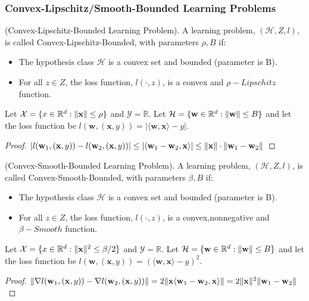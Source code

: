 \subsubsection{Convex-Lipschitz/Smooth-Bounded Learning Problems}

\begin{defn}
	(Convex-Lipschitz-Bounded Learning Problem).
	A learning problem, $ (\mathcal{H}, Z, l) $, is called Convex-Lipschitz-Bounded, with parameters $ \rho, B $ if:
	\begin{itemize}
		\item The hypothesis class $ \mathcal{H} $ is a convex set and bounded (parameter is B).
		\item For all $ z \in Z $, the loss function, $ l(\cdot, z) $, is a convex and $ \rho-Lipschitz $ function.
	\end{itemize}
\end{defn}

\begin{exm}
	Let $ \mathcal{X} = \{ x \in \mathbb{R}^d : \Arrowvert \mathbf{x} \Arrowvert \le \rho \} $ and $ \mathcal{Y} = \mathbb{R} $.
	Let $ \mathcal{H} = \{ \mathbf{w} \in \mathbb{R}^d : \Arrowvert \mathbf{w} \Arrowvert \le B \} $ and
	let the loss function be $ l(\mathbf{w},(\mathbf{x},y)) = | \langle \mathbf{w}, \mathbf{x} \rangle - y | $.
	\begin{proof}
		$ |l(\mathbf{w}_1, (\mathbf{x},y)) - l(\mathbf{w}_2, (\mathbf{x},y))|
		\le |\langle \mathbf{w}_1 - \mathbf{w}_2, \mathbf{x} \rangle|
		\le \Arrowvert \mathbf{x} \Arrowvert \cdot \Arrowvert \mathbf{w}_1 - \mathbf{w}_2 \Arrowvert$
	\end{proof}
\end{exm}

\begin{defn}
	(Convex-Smooth-Bounded Learning Problem).
	A learning problem, $ (\mathcal{H}, Z, l) $, is called Convex-Smooth-Bounded, with parameters $ \beta, B $ if:
	\begin{itemize}
		\item The hypothesis class $ \mathcal{H} $ is a convex set and bounded (parameter is B).
		\item For all $ z \in Z $, the loss function, $ l(\cdot, z) $, is a convex,nonnegative and $ \beta-Smooth $ function.
	\end{itemize}
\end{defn}

\begin{exm}
	Let $ \mathcal{X} = \{ x \in \mathbb{R}^d : \Arrowvert \mathbf{x} \Arrowvert^2 \le \beta/2 \} $ and $ \mathcal{Y} = \mathbb{R} $.
	Let $ \mathcal{H} = \{ \mathbf{w} \in \mathbb{R}^d : \Arrowvert \mathbf{w} \Arrowvert \le B \} $ and
	let the loss function be $ l(\mathbf{w},(\mathbf{x},y)) = {(\langle \mathbf{w}, \mathbf{x} \rangle - y)}^2 $.
	\begin{proof}
		$ \Arrowvert \nabla l(\mathbf{w}_1, (\mathbf{x},y)) - \nabla l(\mathbf{w}_2, (\mathbf{x},y)) \Arrowvert
		= 2 \Arrowvert \mathbf{x} \langle \mathbf{w}_1 - \mathbf{w}_2, \mathbf{x} \rangle \Arrowvert
		= 2 \Arrowvert \mathbf{x} \Arrowvert^2 \Arrowvert \mathbf{w}_1 - \mathbf{w}_2 \Arrowvert  
		$
	\end{proof}	
\end{exm}

